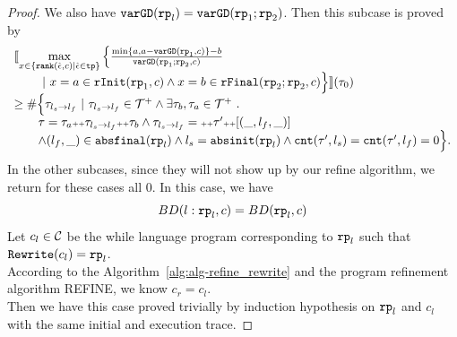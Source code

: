 \begin{proof}
We also have  $\mathtt{varGD}(\mathtt{rp}_l) = \mathtt{varGD}(\mathtt{rp}_1;\mathtt{rp}_2)$.
Then this subcase is proved by 
\[
  \begin{array}{l}
    \econfig{
      \max\limits_{x \in \left\{ \rank(\absevent, c) | \absevent \in \tpath \right\}} 
      \Big\{ \highlight{\frac{\min\{ a, a - \varGD(\rprog_1, c) \} - b}{\varGD(\rprog_1;\rprog_2, c)}}  
      \\ \qquad 
      ~\vert~
      x = a \in \rfinit(\rprog_1, c)
      \land x = b \in \rffinal(\rprog_2;\rprog_2, c)
      \Big\}  
    }(\trace_0) \\
    \geq
    \# \Big\{\trace_{l_s \to l_f} 
    ~\vert~ \trace_{l_s \to l_f} \in \ftdom \land \exists  \trace_b, \trace_a \in \ftdom
    \sthat 
    \\ \qquad
     \trace = \trace_a \tracecat \trace_{l_s \to l_f} \tracecat \trace_b
    \land \trace_{l_s \to l_f} = \tracecat \trace' \tracecat [(\_, l_f, \_)]
    \\ \qquad
    \land (l_{f}, \_) \in \absfinal(\rprog_l)
    \land l_s = \absinit(\rprog_l)
    \land \counter(\trace', l_s) = \counter(\trace', l_f) = 0 
    \Big\}.
    \end{array}
\]
In the other subcases, since they will not show up by our refine algorithm, we return for these cases all $0$.
In this case, we have
\[
  BD(l: \mathtt{rp}_l, c) = BD(\mathtt{rp}_l, c)
\]
Let $c_l \in \mathcal{C}$ be the while language program corresponding to $\mathtt{rp}_l$ such that $\mathtt{Rewrite}(c_l) = \mathtt{rp}_l$.
\\
According to the Algorithm~\ref{alg:alg-refine_rewrite} and the program refinement algorithm REFINE, we know
$c_r = c_l$.
\\
Then we have this case proved trivially by induction hypothesis on $\mathtt{rp}_l$ and $c_l$ with the same initial and execution trace.


\end{proof}
